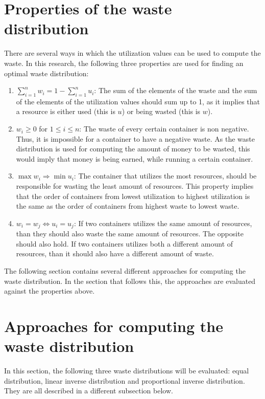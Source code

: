 \section{Properties of the waste distribution}
There are several ways in which the utilization values can be used to compute the waste. In this research, the following three properties are used for finding an optimal waste distribution:
\begin{enumerate}
    \item \textbf{$\sum_{i=1}^n w_i = 1 - \sum_{i=1}^n u_i $}: The sum of the elements of the waste and the sum of the elements of the utilization values should sum up to 1, as it implies that a resource is either used (this is $u$) or being wasted (this is $w$).
    \item \textbf{$w_i \geq 0$} for $1 \leq i \leq n$: The waste of every certain container is non negative. Thus, it is impossible for a container to have a negative waste. As the waste distribution is used for computing the amount of money to be wasted, this would imply that money is being earned, while running a certain container.
    \item \textbf{$\max w_i \Rightarrow \min u_i$}: The container that utilizes the most resources, should be responsible for wasting the least amount of resources. This property implies that the order of containers from lowest utilization to highest utilization is the same as the order of containers from highest waste to lowest waste. 
    \item \textbf{$w_i = w_j \iff u_i = u_j$}: If two containers utilizes the same amount of resources, than they should also waste the same amount of resources. The opposite should also hold. If two containers utilizes both a different amount of resources, than it should also have a different amount of waste.
\end{enumerate}

The following section contains several different approaches for computing the waste distribution. In the section that follows this, the approaches are evaluated against the properties above.

\section{Approaches for computing the waste distribution} \label{sec:approaches}
In this section, the following three waste distributions will be evaluated: equal distribution, linear inverse distribution and proportional inverse distribution. They are all described in a different subsection below.

